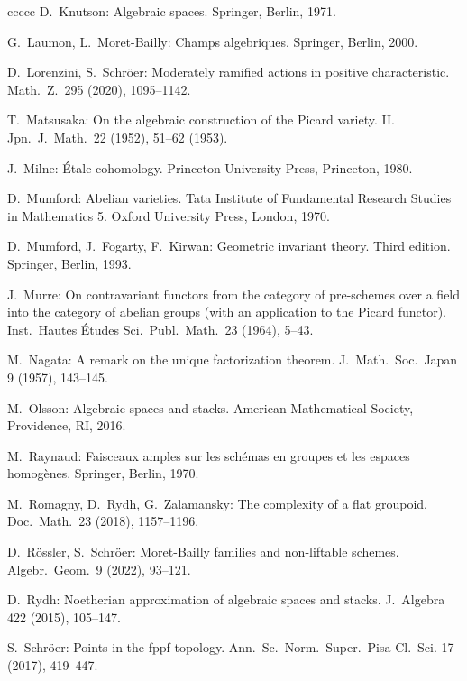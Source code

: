 \documentclass[oneside, 12pt]{amsart}
\theoremstyle{definition}
\theoremstyle{remark}
\begin{document}
\begin{thebibliography}{ccccc}
D.\ Knutson:
Algebraic spaces.
Springer, Berlin, 1971.

G.\ Laumon, L.\ Moret-Bailly:
Champs algebriques.
Springer, Berlin, 2000.

D.\ Lorenzini, S.\ Schr\"oer:
Moderately ramified actions in positive characteristic.
Math.\ Z.\ 295 (2020), 1095--1142.  

T.\ Matsusaka:
On the algebraic construction of the Picard variety. II.
Jpn.\ J.\ Math.\ 22 (1952), 51--62 (1953). 

J.\ Milne: 
\'Etale cohomology.
Princeton University Press, Princeton, 1980.

D.\ Mumford:
Abelian varieties.
Tata Institute of Fundamental Research Studies in Mathematics 5.
Oxford University Press,  London, 1970.

D.\ Mumford, J.\ Fogarty, F.\ Kirwan:
Geometric invariant theory. Third edition.
Springer, Berlin, 1993.

J.\ Murre:
On contravariant functors from the category of pre-schemes over a field into the category of abelian groups 
(with an application to the Picard functor).
Inst.\ Hautes \'Etudes Sci.\ Publ.\ Math.\  23 (1964), 5--43. 

M.\ Nagata:
A remark on the unique factorization theorem.
J.\ Math.\ Soc.\ Japan 9 (1957), 143--145. 

M.\ Olsson:
Algebraic spaces and stacks.
American Mathematical Society, Providence, RI, 2016.

M.\ Raynaud:
Faisceaux amples sur les sch\'emas en groupes et les
espaces homog\`enes.  
Springer, Berlin, 1970.
 
M.\ Romagny, D.\ Rydh, G.\ Zalamansky:
The complexity of a flat groupoid.  
Doc.\ Math.\ 23 (2018), 1157--1196. 

D.\ R\"ossler, S.\ Schr\"oer:
Moret-Bailly families and non-liftable schemes.
Algebr.\ Geom.\ 9 (2022),  93--121. 

D.\ Rydh:
Noetherian approximation of algebraic spaces and stacks.
J.\ Algebra 422 (2015), 105--147.
 
S.\ Schr\"oer:
Points in the fppf topology.
Ann.\ Sc.\ Norm.\ Super.\ Pisa Cl.\ Sci. 17 (2017), 419--447.


\end{thebibliography}
\end{document}
